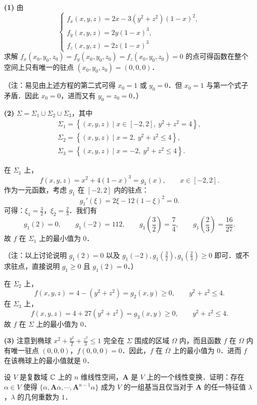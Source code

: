 \begin{solution}
\textbf{(1)} 由
\[
\begin{cases}
f_{x}(x,y,z)=2x-3(y^{2}+z^{2})(1-x)^{2},\\
f_{y}(x,y,z)=2y(1-x)^{3},\\
f_{z}(x,y,z)=2z(1-x)^{3}
\end{cases}
\]
求解 $f_{x}(x_{0},y_{0},z_{0})=f_{y}(x_{0},y_{0},z_{0})=f_{z}(x_{0},y_{0},z_{0})=0$ 的点可得函数在整个空间上只有唯一的驻点 $(x_{0},y_{0},z_{0})=(0,0,0)$．

（注：易见由上述方程的第二式可得 $x_{0}=1$ 或 $y_{0}=0$．但 $x_{0}=1$ 与第一个式子矛盾．因此 $x_{0}=0$，进而又有 $y_{0}=z_{0}=0$．）

\textbf{(2)} $\Sigma=\Sigma_{1}\cup\Sigma_{2}\cup\Sigma_{3}$，其中
\begin{gather*}
\Sigma_{1}=\left\{(x,y,z)\mid x\in[-2,2],\ y^{2}+z^{2}=4\right\},\\
\Sigma_{2}=\left\{(x,y,z)\mid x=2,\ y^{2}+z^{2}\le 4\right\},\\
\Sigma_{3}=\left\{(x,y,z)\mid x=-2,\ y^{2}+z^{2}\le 4\right\}.
\end{gather*}

在 $\Sigma_{1}$ 上，
\[
f(x,y,z)=x^{2}+4(1-x)^{3}=g_{1}(x),\qquad x\in[-2,2].
\]
作为一元函数，考虑 $g_{1}$ 在 $[-2,2]$ 内的驻点：
\[
g_{1}'(\xi)=2\xi-12(1-\xi)^{2}=0.
\]
可得：$\xi_{1}=\frac32$，$\xi_{2}=\frac23$．我们有
\[
g_{1}(2)=0,\qquad g_{1}(-2)=112,\qquad g_{1}\left(\frac32\right)=\frac74,\qquad g_{1}\left(\frac23\right)=\frac{16}{27}.
\]
故 $f$ 在 $\Sigma_{1}$ 上的最小值为 $0$．

（注：以上讨论说明 $g_{1}(2)=0$ 以及 $g_{1}(-2),g_{1}\left(\frac32\right),g_{1}\left(\frac23\right)\ge 0$ 即可．或不求驻点，直接说明 $g_{1}\ge 0$ 且 $g_{1}(2)=0$．）

在 $\Sigma_{2}$ 上，
\[
f(x,y,z)=4-(y^{2}+z^{2})=g_{2}(x,y)\ge 0,\qquad y^{2}+z^{2}\le 4.
\]
在 $\Sigma_{3}$ 上，
\[
f(x,y,z)=4+27(y^{2}+z^{2})=g_{3}(x,y)\ge 0,\qquad y^{2}+z^{2}\le 4.
\]
故 $f$ 在 $\Sigma$ 上的最小值为 $0$．

\textbf{(3)} 注意到椭球 $x^{2}+\frac{y^{2}}{2}+\frac{z^{2}}{3}\le 1$ 完全在 $\Sigma$ 围成的区域 $\Omega$ 内，而且函数 $f$ 在 $\Omega$ 内有唯一驻点 $(0,0,0)$，$f(0,0,0)=0$．因此，$f$ 在 $\overline{\Omega}$ 上的最小值为 $0$．进而 $f$ 在该椭球上的最小值就是 $0$．
\end{solution}

设 $V$ 是复数域 $\mathbb{C}$ 上的 $n$ 维线性空间，$\bm{A}$ 是 $V$ 上的一个线性变换．证明：存在 $\alpha\in V$ 使得 $\{\alpha,\bm{A}\alpha,\cdots,\bm{A}^{n-1}\alpha\}$ 成为 $V$ 的一组基当且仅当对于 $\bm{A}$ 的任一特征值 $\lambda$，$\lambda$ 的几何重数为 $1$．


